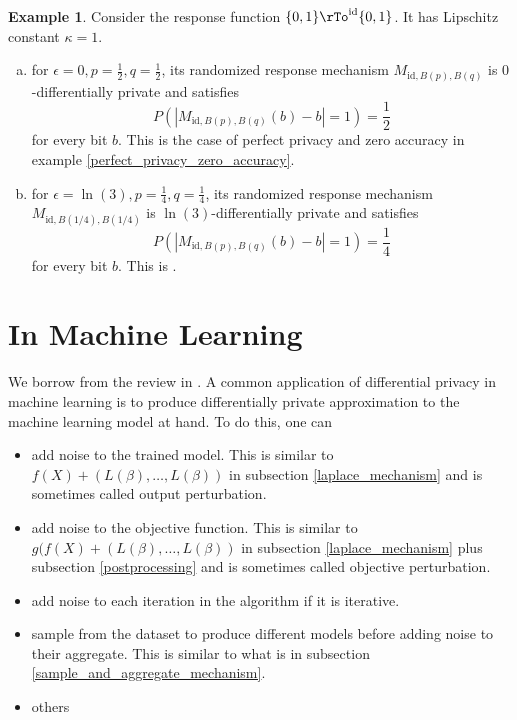 \documentclass[12pt]{amsart}
\theoremstyle{definition}
\newtheorem{example}[theorem]{Example}
\begin{document}
\begin{example} \label{randomized_response_mechanism_response_function} Consider the response function $\{0, 1\}\rTo^{\text{id}} \{0, 1\}$. It has Lipschitz constant $\kappa = 1$.
\begin{enumerate}[a.]
\item for $\epsilon = 0, p = \frac{1}{2}, q = \frac{1}{2}$, its randomized response mechanism $M_{\text{id}, B(p), B(q)}$ is $0$-differentially private and satisfies 
$$P(|M_{\text{id}, B(p), B(q)}(b) - b| = 1) = \frac{1}{2}$$
for every bit $b$. This is the case of perfect privacy and zero accuracy in example \ref{perfect_privacy_zero_accuracy}.
\item for $\epsilon = \ln(3), p = \frac{1}{4}, q = \frac{1}{4}$, its randomized response mechanism $M_{\text{id}, B(1/4), B(1/4)}$ is $\ln(3)$-differentially private and satisfies 
$$P(|M_{\text{id}, B(p), B(q)}(b) - b| = 1) = \frac{1}{4}$$
for every bit $b$. This is \cite[subsection 3.2]{algorithmic_foundations}.
\end{enumerate} 
\end{example}

\section{In Machine Learning} \label{in_machine_learning} We borrow from the review in \cite[section 2]{survey_and_review}. A common application of differential privacy in machine learning is to produce differentially private approximation to the machine learning model at hand. To do this, one can
\begin{itemize}
\item add noise to the trained model. This is similar to $f(X) + (L(\beta), \dots , L(\beta))$ in subsection \ref{laplace_mechanism} and is sometimes called output perturbation.
\item add noise to the objective function. This is similar to $g(f(X) + (L(\beta), \dots , L(\beta))$ in subsection \ref{laplace_mechanism} plus subsection \ref{postprocessing} and is sometimes called objective perturbation.
\item add noise to each iteration in the algorithm if it is iterative.
\item sample from the dataset to produce different models before adding noise to their aggregate. This is similar to what is in subsection \ref{sample_and_aggregate_mechanism}.
\item others
\end{itemize}
\end{document}
